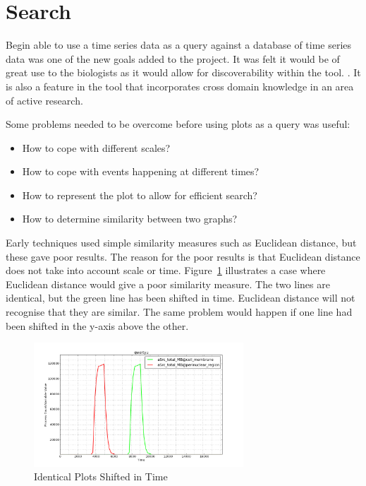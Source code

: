 \section{Search}

Begin able to use a time series data as a query against a database of time series data was one of the new goals added to the project.  It was felt it would be of great use to the biologists as it would allow for discoverability within the tool. .  It is also a feature in the tool that incorporates cross domain knowledge in an area of active research.

Some problems needed to be overcome before using plots as a query was useful:
\begin{itemize}
\item How to cope with different scales?
\item How to cope with events happening at different times?
\item How to represent the plot to allow for efficient search?
\item How to determine similarity between two graphs?
\end{itemize}

Early techniques used simple similarity measures such as Euclidean distance, but these gave poor results.  The reason for the poor results is that Euclidean distance does not take into account scale or time.  Figure~\ref{fig:similar} illustrates a case where Euclidean distance would give a poor similarity measure.  The two lines are identical, but the green line has been shifted in time.  Euclidean distance will not recognise that they are similar.  The same problem would happen if one line had been shifted in the y-axis above the other.

\begin{figure}[h!]
    \centering
    \includegraphics[width=0.7\textwidth]{images/similar_plots.png}
    \caption{Identical Plots Shifted in Time}
    \label{fig:similar}
\end{figure}

